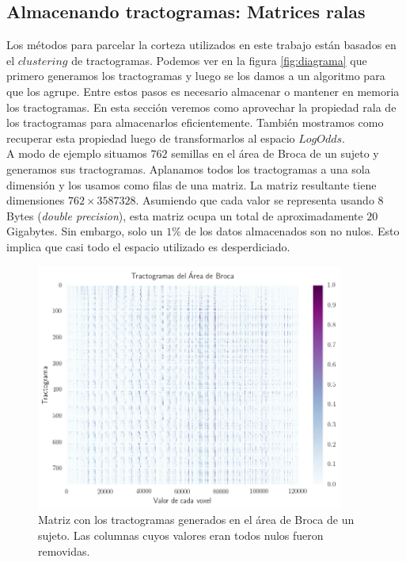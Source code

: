 \subsection{Almacenando tractogramas: Matrices ralas}
\label{sec:ralas}

Los m\'etodos para parcelar la corteza utilizados en este trabajo est\'an
basados en el $clustering$ de tractogramas. Podemos ver en la figura 
\ref{fig:diagrama} que primero generamos los tractogramas y luego se los
damos a un algoritmo para que los agrupe. Entre estos pasos es necesario
almacenar o mantener en memoria los tractogramas. En esta secci\'on
veremos como aprovechar la propiedad rala de los tractogramas para 
almacenarlos eficientemente. Tambi\'en mostramos como recuperar esta
propiedad luego de transformarlos al espacio $LogOdds$. \\ 
 
A modo de ejemplo situamos $762$ semillas en el \'area de Broca de un 
sujeto y generamos sus tractogramas. Aplanamos todos los tractogramas
a una sola dimensi\'on y los usamos como filas de una matriz. La matriz 
resultante tiene dimensiones $762\times3587328$. Asumiendo que cada valor
se representa usando $8$ Bytes ({\it double precision}), esta matriz ocupa
un total de
aproximadamente $20$ Gigabytes. Sin embargo, solo un $1\%$
de los datos almacenados son no nulos. Esto implica que casi todo el
espacio utilizado es desperdiciado.\\

\begin{figure}[h!]
   \centering
    \includegraphics[width=0.9\textwidth]{img/densa_broca.png}
    \caption{Matriz con los tractogramas generados en el \'area de Broca
             de un sujeto. Las columnas cuyos valores eran todos nulos
             fueron removidas. }
    \label{fig:densa}
\end{figure}

